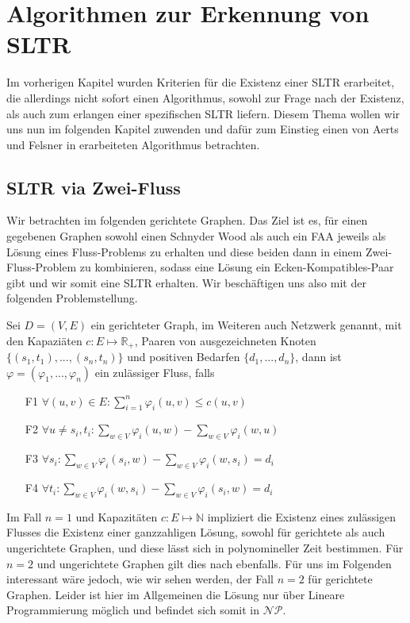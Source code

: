 \chapter{Algorithmen zur Erkennung von SLTR}

Im vorherigen Kapitel wurden Kriterien für die Existenz einer SLTR erarbeitet, die allerdings nicht sofort einen Algorithmus, sowohl zur Frage nach der Existenz, als auch zum erlangen einer spezifischen SLTR liefern. Diesem Thema wollen wir uns nun im folgenden Kapitel zuwenden und dafür zum Einstieg einen von Aerts und Felsner in \cite{af13} erarbeiteten Algorithmus betrachten.

\section{SLTR via Zwei-Fluss}

Wir betrachten im folgenden gerichtete Graphen. Das Ziel ist es, für einen gegebenen Graphen sowohl einen Schnyder Wood als auch ein FAA jeweils als Lösung eines Fluss-Problems zu erhalten und diese beiden dann in einem Zwei-Fluss-Problem zu kombinieren, sodass eine Lösung ein Ecken-Kompatibles-Paar gibt und wir somit eine SLTR erhalten. Wir beschäftigen uns also mit der folgenden Problemstellung.

\begin{definition}
Sei $D=(V,E)$ ein gerichteter Graph, im Weiteren auch Netzwerk genannt, mit den Kapaziäten $c:E\mapsto\mathbb{R}_{+}$, Paaren von ausgezeichneten Knoten $\{(s_1,t_1), ... ,(s_n,t_n)\}$ und positiven Bedarfen $\{d_1, ... ,d_n\}$, dann ist $\varphi=(\varphi_1, ... ,\varphi_n)$ ein zulässiger Fluss, falls
\begin{itemize}
\item[F1] $\forall (u,v) \in E : \sum_{i=1}^{n}{\varphi_i(u,v)} \leq c(u,v) $
\item[F2] $ \forall u \neq s_i,t_i : \sum_{w \in V} \varphi_i(u,w) - \sum_{w \in V} \varphi_i(w,u) $
\item[F3] $ \forall s_i : \sum_{w \in V} \varphi_i(s_i,w) - \sum_{w \in V} \varphi_i(w,s_i) = d_i $
\item[F4] $ \forall t_i : \sum_{w \in V} \varphi_i(w,s_i) - \sum_{w \in V} \varphi_i(s_i,w) = d_i $
\end{itemize}
\end{definition}

\begin{remark}
Im Fall $n=1$ und Kapazitäten $c:E\mapsto\mathbb{N}$ impliziert die Existenz eines zulässigen Flusses die Existenz einer ganzzahligen Lösung, sowohl für gerichtete als auch ungerichtete Graphen, und diese lässt sich in polynomineller Zeit bestimmen. Für $n=2$ und ungerichtete Graphen gilt dies nach \cite{hu} ebenfalls. Für uns im Folgenden interessant wäre jedoch, wie wir sehen werden, der Fall $n=2$ für gerichtete Graphen. Leider ist hier im Allgemeinen die Lösung nur über Lineare Programmierung möglich und befindet sich somit in $\mathcal{NP}$.
\end{remark}

